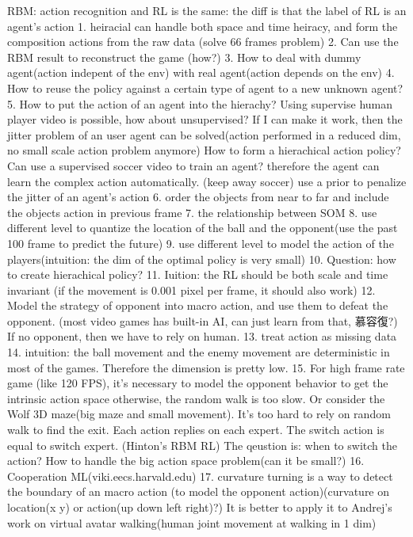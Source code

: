 RBM:
action recognition and RL is the same: the diff is that the label of RL is an agent's action
1. heiracial can handle both space and time heiracy, and form the composition actions from the raw data
(solve 66 frames problem)
2. Can use the RBM result to reconstruct the game (how?) 
3. How to deal with dummy agent(action indepent of the env) with real agent(action depends on the env)
4. How to reuse the policy against a certain type of agent to a new unknown agent?
5. How to put the action of an agent into the hierachy? Using supervise human player video is possible, how about unsupervised?
If I can make it work, then the jitter problem of an user agent can be solved(action performed in a reduced dim, no small scale action problem anymore)
How to form a hierachical action policy?
Can use a supervised soccer video to train an agent? therefore the agent can learn the complex action automatically. (keep away soccer)
use a prior to penalize the jitter of an agent's action
6. order the objects from near to far and include the objects action in previous frame
7. the relationship between SOM
8. use different level to quantize the location of the ball and the opponent(use the past 100 frame to predict the future)
9. use different level to model the action of the players(intuition: the dim of the optimal policy is very small)
10. Question: how to create hierachical policy?
11. Iuition: the RL should be both scale and time invariant (if the movement is 0.001 pixel per frame, it should also work)
12. Model the strategy of opponent into macro action, and use them to defeat the opponent. (most video games has built-in AI, can just learn from that, 慕容復?)
If no opponent, then we have to rely on human.
13. treat action as missing data
14. intuition: the ball movement and the enemy movement are deterministic in most of the games. Therefore the dimension is pretty low.
15. For high frame rate game (like 120 FPS), it's necessary to model the opponent behavior to get the intrinsic action space
otherwise, the random walk is too slow. Or consider the Wolf 3D maze(big maze and small movement). It's too hard to rely on random walk to find the exit.
Each action replies on each expert. The switch action is equal to switch expert. (Hinton's RBM RL)
The qeustion is: when to switch the action? How to handle the big action space problem(can it be small?)
16. Cooperation ML(viki.eecs.harvald.edu)
17. curvature turning is a way to detect the boundary of an macro action (to model the opponent action)(curvature on location(x y) or action(up down left right)?)
It is better to apply it to Andrej's work on virtual avatar walking(human joint movement at walking in 1 dim)
